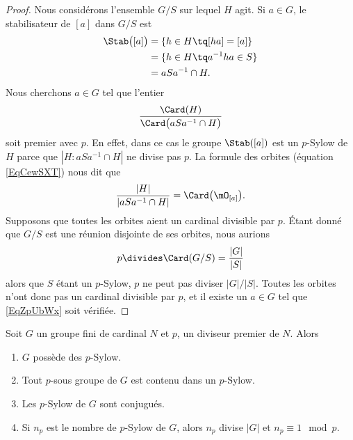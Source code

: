 \begin{proof}
    Nous considérons l'ensemble \( G/S\) sur lequel \( H\) agit. Si \( a\in G\), le stabilisateur de \( [a]\) dans \( G/S\) est
    \begin{subequations}
        \begin{align}
            \Stab\big( [a] \big)&=\{ h\in H\tq [ha]=[a] \}\\
            &=\{ h\in H\tq a^{-1}ha\in S\}\\
            &=aSa^{-1}\cap H.
        \end{align}
    \end{subequations}
    Nous cherchons \( a\in G\) tel que l'entier
    \begin{equation}        \label{EqZpUbWx}
        \frac{ \Card(H) }{ \Card\big( aSa^{-1}\cap H \big) }
    \end{equation}
    soit premier avec \( p\). En effet, dans ce cas le groupe \( \Stab([a])\) est un $p$-Sylow de \( H\) parce que \( | H:aSa^{-1}\cap H |\) ne divise pas \( p\). La formule des orbites (équation \eqref{EqCewSXT}) nous dit que
    \begin{equation}
        \frac{ | H | }{ | aSa^{-1}\cap H | }=\Card\big( \mO_{[a]} \big).
    \end{equation}
    Supposons que toutes les orbites aient un cardinal divisible par \( p\). Étant donné que \( G/S\) est une réunion disjointe de ses orbites, nous aurions
    \begin{equation}
        p\divides \Card(G/S)=\frac{ | G | }{ | S | }
    \end{equation}
    alors que \( S\) étant un $p$-Sylow, \( p\) ne peut pas diviser \( | G |/| S |\). Toutes les orbites n'ont donc pas un cardinal divisible par \( p\), et il existe un \( a\in G\) tel que \eqref{EqZpUbWx} soit vérifiée.
\end{proof}


\begin{theorem}  \label{ThoUkPDXf}
    Soit \( G\) un groupe fini de cardinal \( N\) et \( p\), un diviseur premier de \( N\). Alors
    \begin{enumerate}
        \item
            \( G\) possède des \( p\)-Sylow.
        \item
            Tout \( p\)-sous groupe de \( G\) est contenu dans un \( p\)-Sylow.
        \item   \label{ItemMzNRVf}
            Les \( p\)-Sylow de \( G\) sont conjugués.
        \item   \label{ItemkYbdzZ}
            Si \( n_p\) est le nombre de $p$-Sylow de \( G\), alors \( n_p\) divise \( | G |\) et \( n_p\equiv 1\mod p\).
    \end{enumerate}
\end{theorem}

